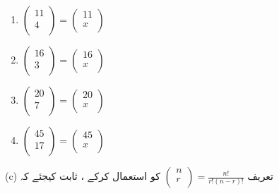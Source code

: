  \begin{enumerate}
 \item
 \( \begin{pmatrix}
11\\
4\\
\end{pmatrix} 
=
\begin{pmatrix}
11\\
x\\
\end{pmatrix}\)\\
\item
\(\begin{pmatrix}
16\\
3\\
\end{pmatrix}
=
\begin{pmatrix}
16\\
x\\
\end{pmatrix}\)\\
\item
\(\begin{pmatrix}
20\\
7\\
\end{pmatrix}
=
\begin{pmatrix}
20\\
x\\
\end{pmatrix}\)\\
\item
\( \begin{pmatrix}
45\\
17\\
\end{pmatrix}
=
\begin{pmatrix}
45\\
x\\
\end{pmatrix}\)\\
\end{enumerate}
(c)
  تعریف 
   \(\begin{pmatrix}
n\\
r\\
\end{pmatrix}
=
\frac{n!}{r!(n-r)!}\)
  کو استعمال کرکے  ،  ثابت کیجئے کہ 

